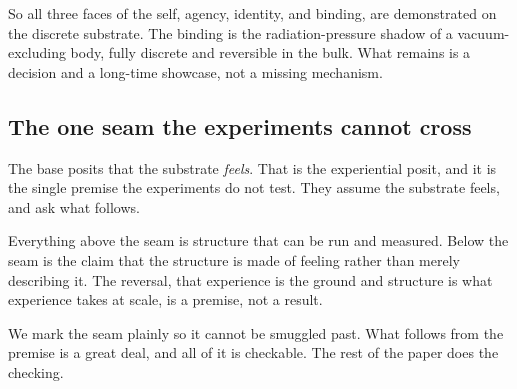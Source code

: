 So all three faces of the self, agency, identity, and binding, are demonstrated on the discrete substrate. The binding is the radiation-pressure shadow of a vacuum-excluding body, fully discrete and reversible in the bulk. What remains is a decision and a long-time showcase, not a missing mechanism.

\subsection{The one seam the experiments cannot cross}

The base posits that the substrate \emph{feels}. That is the experiential posit, and it is the single premise the experiments do not test. They assume the substrate feels, and ask what follows.

\begin{result}
Everything above the seam is structure that can be run and measured. Below the seam is the claim that the structure is made of feeling rather than merely describing it. The reversal, that experience is the ground and structure is what experience takes at scale, is a premise, not a result.
\end{result}

We mark the seam plainly so it cannot be smuggled past. What follows from the premise is a great deal, and all of it is checkable. The rest of the paper does the checking.
